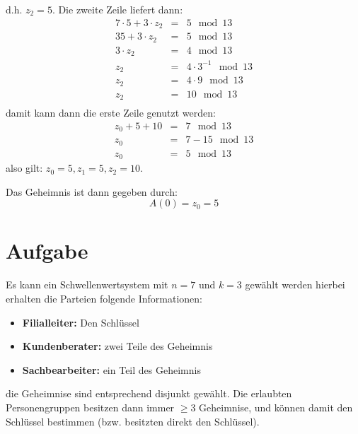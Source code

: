\documentclass[DIN, pagenumber=false, fontsize=11pt, parskip=half]{scrartcl}
\begin{document}
    d.h. $z_2 = 5$. Die zweite Zeile liefert dann:
    \begin{eqnarray}
        7 \cdot 5 + 3 \cdot z_2 &=& 5 \mod 13 \\
        35 + 3 \cdot z_2 &=& 5 \mod 13 \\
        3 \cdot z_2 &=& 4 \mod 13 \\
        z_2 &=& 4 \cdot 3^{-1} \mod 13 \\
        z_2 &=& 4 \cdot 9 \mod 13 \\
        z_2 &=& 10 \mod 13 \\
    \end{eqnarray}
    damit kann dann die erste Zeile genutzt werden:
    \begin{eqnarray}
        z_0 + 5 + 10 &=& 7 \mod 13 \\
        z_0 &=& 7 - 15 \mod 13 \\
        z_0 &=& 5 \mod 13
    \end{eqnarray}
    also gilt: $z_0 = 5, z_1 = 5, z_2 = 10$.

    Das Geheimnis ist dann gegeben durch:
    \begin{equation}
        A(0) = z_0 = 5
    \end{equation}

    \section{Aufgabe}
    Es kann ein Schwellenwertsystem mit $n=7$ und $k=3$ gewählt werden hierbei erhalten die Parteien folgende
    Informationen:
    \begin{itemize}
        \item \textbf{Filialleiter:} Den Schlüssel
        \item \textbf{Kundenberater:} zwei Teile des Geheimnis
        \item \textbf{Sachbearbeiter:} ein Teil des Geheimnis
    \end{itemize}
    die Geheimnise sind entsprechend disjunkt gewählt. Die erlaubten Personengruppen besitzen dann immer $\geq 3$
    Geheimnise, und können damit den Schlüssel bestimmen (bzw. besitzten direkt den Schlüssel).
\end{document}
